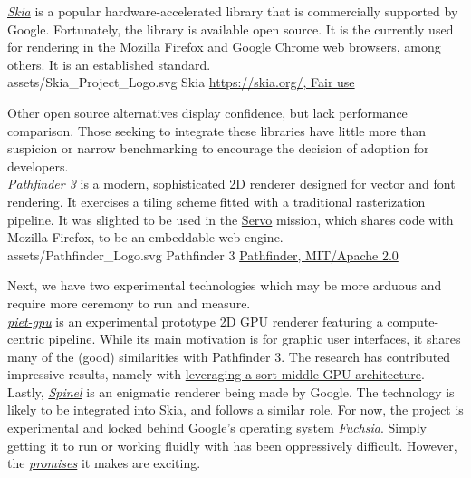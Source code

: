 \href{https://skia.org}{\textit{Skia}} is a popular hardware-accelerated library that is commercially supported by Google. Fortunately, the library is available open source. It is the currently used for rendering in the Mozilla Firefox and Google Chrome web browsers, among others. It is an established standard.\\

\smallsvg
{assets/Skia_Project_Logo.svg}
{Skia}
{\href{https://skia.org}{https://skia.org/, Fair use}}

Other open source alternatives display confidence, but lack performance comparison. Those seeking to integrate these libraries have little more than suspicion or narrow benchmarking to encourage the decision of adoption for developers.\\

\href{https://github.com/servo/pathfinder}{\textit{Pathfinder 3}} is a modern, sophisticated 2D renderer designed for vector and font rendering. It exercises a tiling scheme fitted with a traditional rasterization pipeline. It was slighted to be used in the \href{https://servo.org/}{Servo} mission, which shares code with Mozilla Firefox, to be an embeddable web engine.\\

\smallsvg
{assets/Pathfinder_Logo.svg}
{Pathfinder 3}
{\href{https://github.com/servo/pathfinder}{Pathfinder, MIT/Apache 2.0}}

Next, we have two experimental technologies which may be more arduous and require more ceremony to run and measure.\\

\href{https://github.com/linebender/piet-gpu}{\textit{piet-gpu}} is an experimental prototype 2D GPU renderer featuring a compute-centric pipeline. While its main motivation is for graphic user interfaces, it shares many of the (good) similarities with Pathfinder 3. The research has contributed impressive results, namely with \href{https://raphlinus.github.io/rust/graphics/gpu/2020/06/12/sort-middle.html}{leveraging a sort-middle GPU architecture}.\\

Lastly, \href{https://fuchsia.googlesource.com/fuchsia/+/refs/heads/main/src/graphics/lib/compute/spinel/README.md}{\textit{Spinel}} is an enigmatic renderer being made by Google. The technology is likely to be integrated into Skia, and follows a similar role. For now, the project is experimental and locked behind Google's operating system \textit{Fuchsia}. Simply getting it to run or working fluidly with has been oppressively difficult. However, the \href{https://fuchsia.googlesource.com/fuchsia/+/refs/heads/main/src/graphics/lib/compute/spinel/README.md}{\emph{promises}} it makes are exciting.

